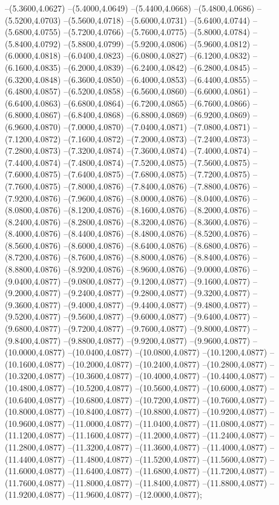 {	--(5.3600,4.0627)
	--(5.4000,4.0649)
	--(5.4400,4.0668)
	--(5.4800,4.0686)
	--(5.5200,4.0703)
	--(5.5600,4.0718)
	--(5.6000,4.0731)
	--(5.6400,4.0744)
	--(5.6800,4.0755)
	--(5.7200,4.0766)
	--(5.7600,4.0775)
	--(5.8000,4.0784)
	--(5.8400,4.0792)
	--(5.8800,4.0799)
	--(5.9200,4.0806)
	--(5.9600,4.0812)
	--(6.0000,4.0818)
	--(6.0400,4.0823)
	--(6.0800,4.0827)
	--(6.1200,4.0832)
	--(6.1600,4.0835)
	--(6.2000,4.0839)
	--(6.2400,4.0842)
	--(6.2800,4.0845)
	--(6.3200,4.0848)
	--(6.3600,4.0850)
	--(6.4000,4.0853)
	--(6.4400,4.0855)
	--(6.4800,4.0857)
	--(6.5200,4.0858)
	--(6.5600,4.0860)
	--(6.6000,4.0861)
	--(6.6400,4.0863)
	--(6.6800,4.0864)
	--(6.7200,4.0865)
	--(6.7600,4.0866)
	--(6.8000,4.0867)
	--(6.8400,4.0868)
	--(6.8800,4.0869)
	--(6.9200,4.0869)
	--(6.9600,4.0870)
	--(7.0000,4.0870)
	--(7.0400,4.0871)
	--(7.0800,4.0871)
	--(7.1200,4.0872)
	--(7.1600,4.0872)
	--(7.2000,4.0873)
	--(7.2400,4.0873)
	--(7.2800,4.0873)
	--(7.3200,4.0874)
	--(7.3600,4.0874)
	--(7.4000,4.0874)
	--(7.4400,4.0874)
	--(7.4800,4.0874)
	--(7.5200,4.0875)
	--(7.5600,4.0875)
	--(7.6000,4.0875)
	--(7.6400,4.0875)
	--(7.6800,4.0875)
	--(7.7200,4.0875)
	--(7.7600,4.0875)
	--(7.8000,4.0876)
	--(7.8400,4.0876)
	--(7.8800,4.0876)
	--(7.9200,4.0876)
	--(7.9600,4.0876)
	--(8.0000,4.0876)
	--(8.0400,4.0876)
	--(8.0800,4.0876)
	--(8.1200,4.0876)
	--(8.1600,4.0876)
	--(8.2000,4.0876)
	--(8.2400,4.0876)
	--(8.2800,4.0876)
	--(8.3200,4.0876)
	--(8.3600,4.0876)
	--(8.4000,4.0876)
	--(8.4400,4.0876)
	--(8.4800,4.0876)
	--(8.5200,4.0876)
	--(8.5600,4.0876)
	--(8.6000,4.0876)
	--(8.6400,4.0876)
	--(8.6800,4.0876)
	--(8.7200,4.0876)
	--(8.7600,4.0876)
	--(8.8000,4.0876)
	--(8.8400,4.0876)
	--(8.8800,4.0876)
	--(8.9200,4.0876)
	--(8.9600,4.0876)
	--(9.0000,4.0876)
	--(9.0400,4.0877)
	--(9.0800,4.0877)
	--(9.1200,4.0877)
	--(9.1600,4.0877)
	--(9.2000,4.0877)
	--(9.2400,4.0877)
	--(9.2800,4.0877)
	--(9.3200,4.0877)
	--(9.3600,4.0877)
	--(9.4000,4.0877)
	--(9.4400,4.0877)
	--(9.4800,4.0877)
	--(9.5200,4.0877)
	--(9.5600,4.0877)
	--(9.6000,4.0877)
	--(9.6400,4.0877)
	--(9.6800,4.0877)
	--(9.7200,4.0877)
	--(9.7600,4.0877)
	--(9.8000,4.0877)
	--(9.8400,4.0877)
	--(9.8800,4.0877)
	--(9.9200,4.0877)
	--(9.9600,4.0877)
	--(10.0000,4.0877)
	--(10.0400,4.0877)
	--(10.0800,4.0877)
	--(10.1200,4.0877)
	--(10.1600,4.0877)
	--(10.2000,4.0877)
	--(10.2400,4.0877)
	--(10.2800,4.0877)
	--(10.3200,4.0877)
	--(10.3600,4.0877)
	--(10.4000,4.0877)
	--(10.4400,4.0877)
	--(10.4800,4.0877)
	--(10.5200,4.0877)
	--(10.5600,4.0877)
	--(10.6000,4.0877)
	--(10.6400,4.0877)
	--(10.6800,4.0877)
	--(10.7200,4.0877)
	--(10.7600,4.0877)
	--(10.8000,4.0877)
	--(10.8400,4.0877)
	--(10.8800,4.0877)
	--(10.9200,4.0877)
	--(10.9600,4.0877)
	--(11.0000,4.0877)
	--(11.0400,4.0877)
	--(11.0800,4.0877)
	--(11.1200,4.0877)
	--(11.1600,4.0877)
	--(11.2000,4.0877)
	--(11.2400,4.0877)
	--(11.2800,4.0877)
	--(11.3200,4.0877)
	--(11.3600,4.0877)
	--(11.4000,4.0877)
	--(11.4400,4.0877)
	--(11.4800,4.0877)
	--(11.5200,4.0877)
	--(11.5600,4.0877)
	--(11.6000,4.0877)
	--(11.6400,4.0877)
	--(11.6800,4.0877)
	--(11.7200,4.0877)
	--(11.7600,4.0877)
	--(11.8000,4.0877)
	--(11.8400,4.0877)
	--(11.8800,4.0877)
	--(11.9200,4.0877)
	--(11.9600,4.0877)
	--(12.0000,4.0877);
}
